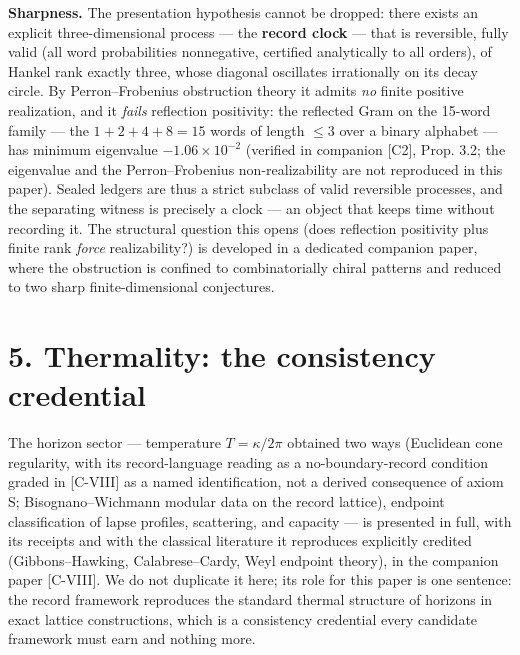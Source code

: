\documentclass[11pt]{article}
\begin{document}
\textbf{Sharpness.}  The presentation hypothesis cannot be dropped: there exists an explicit three-dimensional process — the \textbf{record clock} — that is reversible, fully valid (all word probabilities nonnegative, certified analytically to all orders), of Hankel rank exactly three, whose diagonal oscillates irrationally on its decay circle.  By Perron–Frobenius obstruction theory it admits \emph{no} finite positive realization, and it \emph{fails} reflection positivity: the reflected Gram on the 15-word family — the $1 + 2 + 4 + 8 = 15$ words of length $\le 3$ over a binary alphabet — has minimum eigenvalue $-1.06\times 10^{-2}$ (verified in companion [C2], Prop. 3.2; the eigenvalue and the Perron–Frobenius non-realizability are not reproduced in this paper).  Sealed ledgers are thus a strict subclass of valid reversible processes, and the separating witness is precisely a clock — an object that keeps time without recording it.  The structural question this opens (does reflection positivity plus finite rank \emph{force} realizability?) is developed in a dedicated companion paper, where the obstruction is confined to combinatorially chiral patterns and reduced to two sharp finite-dimensional conjectures.

\section*{5. Thermality: the consistency credential}
The horizon sector — temperature $T = \kappa/2\pi$ obtained two ways (Euclidean cone regularity, with its record-language reading as a no-boundary-record condition graded in [C-VIII] as a named identification, not a derived consequence of axiom S; Bisognano–Wichmann modular data on the record lattice), endpoint classification of lapse profiles, scattering, and capacity — is presented in full, with its receipts and with the classical literature it reproduces explicitly credited (Gibbons–Hawking, Calabrese–Cardy, Weyl endpoint theory), in the companion paper [C-VIII].  We do not duplicate it here; its role for this paper is one sentence: the record framework reproduces the standard thermal structure of horizons in exact lattice constructions, which is a consistency credential every candidate framework must earn and nothing more.
\end{document}
